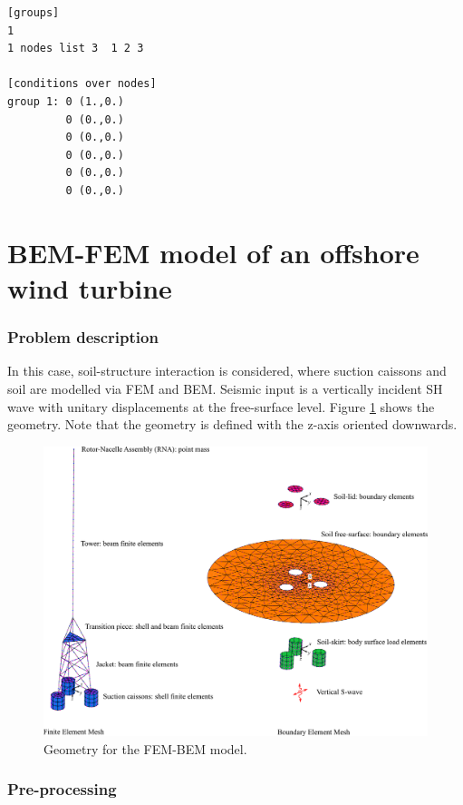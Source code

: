 \documentclass[a4]{article}
\begin{document}
\begin{Verbatim}
[groups]
1
1 nodes list 3  1 2 3 

[conditions over nodes]
group 1: 0 (1.,0.)
         0 (0.,0.)
         0 (0.,0.)
         0 (0.,0.)
         0 (0.,0.)
         0 (0.,0.)
\end{Verbatim}

\part{BEM-FEM model of an offshore wind turbine}

\section{Problem description}

In this case, soil-structure interaction is considered, where suction caissons and soil are modelled via FEM and BEM. Seismic input is a vertically incident SH wave with unitary displacements at the free-surface level. Figure \ref{fig:geometry2} shows the geometry. Note that the geometry is defined with the z-axis oriented downwards.

\begin{figure}[tbh!]
	\centering
	\includegraphics[scale=0.35]{owt_model_flexible.pdf}
	\caption{Geometry for the FEM-BEM model.}
	\label{fig:geometry2}
\end{figure}

\section{Pre-processing}
\end{document}
